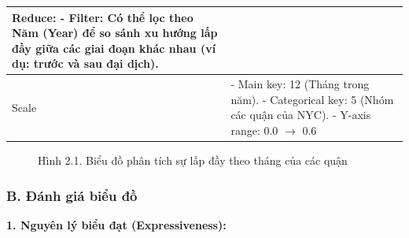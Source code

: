 \begin{longtable}{|p{2.8cm}|p{11.5cm}|}
\newline
\textbf{Reduce:} \newline
\newline
- Filter: Có thể lọc theo Năm (Year) để so sánh xu hướng lấp đầy giữa các giai đoạn khác nhau (ví dụ: trước và sau đại dịch). \\
\hline
Scale & - Main key: 12 (Tháng trong năm). \newline
\newline
- Categorical key: 5 (Nhóm các quận của NYC). \newline
\newline
- Y-axis range: 0.0 $\rightarrow$ 0.6 \\
\hline
\end{longtable}

\begin{figure}[H]
    \centering
    \caption{Hình 2.1. Biểu đồ phân tích sự lấp đầy theo tháng của các quận}
    \label{fig:domain-task2-chart1}
\end{figure}

\subsubsection*{B. Đánh giá biểu đồ}

\textbf{1. Nguyên lý biểu đạt (Expressiveness):}

